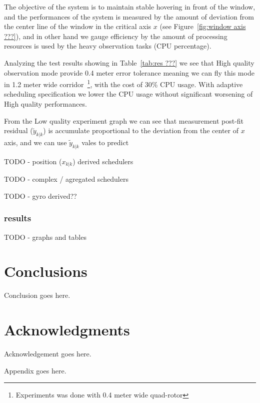 \documentclass{sig-alternate-ipsn13}
\begin{document}
The objective of the system is to maintain stable hovering in front of the window, and the performances of the system is measured by the amount of deviation from the center line of the window in the critical axis $x$ (see Figure~\ref{fig:window axis ???}), and in other hand we gauge efficiency by the amount of processing resources is used by the heavy observation tasks (CPU percentage).

Analyzing the test results showing in Table~\ref{tab:res ???} we see that High quality observation mode provide 0.4 meter error tolerance meaning we can fly this mode in 1.2 meter wide corridor~\footnote{Experiments was done with 0.4 meter wide quad-rotor}, with the cost of 30\% CPU usage. 
With adaptive scheduling specification we lower the CPU usage without significant worsening of High quality performances.

From the Low quality experiment graph we can see that measurement post-fit residual ($\tilde{y}_{k|k}$) is accumulate proportional to the deviation from the center of $x$ axis, and we can use $\tilde{y}_{k|k}$ vales to predict 


TODO - position ($x_{k|k}$)  derived schedulers

TODO - complex / agregated schedulers

TODO - gyro derived??


\subsubsection{results}
TODO - graphs and tables


\section{Conclusions}
Conclusion goes here.


\section*{Acknowledgments}
Acknowledgement goes here.


%

%
%
\appendix

Appendix goes here.

\end{document}
